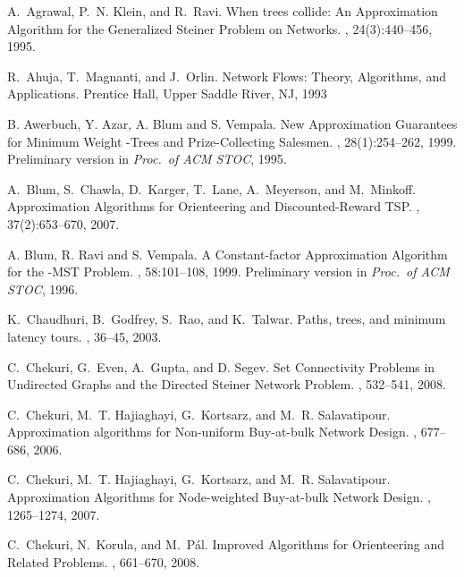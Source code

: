 \documentclass[11pt]{article}
\begin{document}
\begin{thebibliography}{99}
A.~Agrawal, P.~N. Klein, and R.~Ravi.
\newblock When trees collide: An Approximation Algorithm for the Generalized
  {S}teiner Problem on Networks.
, 24(3):440--456, 1995.

R.~Ahuja, T.~Magnanti, and J.~Orlin.
\newblock Network Flows: Theory, Algorithms, and Applications.
\newblock Prentice Hall, Upper Saddle River, NJ, 1993

B. Awerbuch, Y. Azar, A. Blum and S. Vempala.
\newblock  New Approximation Guarantees for Minimum Weight -Trees and 
Prize-Collecting Salesmen.
, 28(1):254--262, 1999. Preliminary
version in {\em Proc.\ of ACM STOC}, 1995.

A.~Blum, S.~Chawla, D.~Karger, T.~Lane, A.~Meyerson, and M.~Minkoff.
\newblock Approximation Algorithms for Orienteering and Discounted-Reward TSP.
, 37(2):653--670, 2007.

A. Blum, R. Ravi and S. Vempala.
\newblock  A Constant-factor Approximation Algorithm for the -MST Problem.
, 58:101--108, 1999.
\newblock Preliminary version in {\em Proc.\ of ACM STOC}, 1996.

K.~Chaudhuri, B.~Godfrey, S.~Rao, and K.~Talwar.
\newblock Paths, trees, and minimum latency tours.
, 36--45, 2003.

C.~Chekuri, G.~Even, A.~Gupta, and D. Segev.
\newblock Set Connectivity Problems in Undirected Graphs and the 
Directed Steiner Network Problem.
, 532--541, 2008.

C.~Chekuri, M.~T. Hajiaghayi, G.~Kortsarz, and M.~R. Salavatipour.
\newblock Approximation algorithms for Non-uniform Buy-at-bulk Network Design.
, 677--686, 2006.

C.~Chekuri, M.~T. Hajiaghayi, G.~Kortsarz, and M.~R. Salavatipour.
\newblock Approximation Algorithms for Node-weighted Buy-at-bulk Network
  Design.
, 1265--1274, 2007.

C.~Chekuri, N.~Korula, and M.~P\'{a}l.
\newblock Improved Algorithms for Orienteering and Related Problems.
, 661--670, 2008.


\end{thebibliography}
\end{document}
